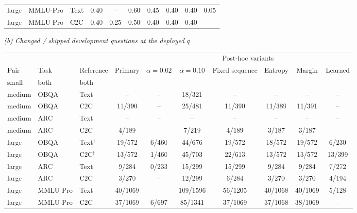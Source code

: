 \begin{table}[!htbp]
\begin{tabular*}{\linewidth}{@{}lll@{\extracolsep{\fill}}ccccccc@{}}
large & MMLU-Pro & Text & 0.40 & -- & 0.60 & 0.45 & 0.40 & 0.40 & 0.05\\
large & MMLU-Pro & C2C & 0.40 & 0.25 & 0.50 & 0.40 & 0.40 & 0.40 & --\\\bottomrule
\end{tabular*}
\par\vspace{17pt}
\textit{(b) Changed / skipped development questions at the deployed $q$}\par\smallskip
\begin{tabular*}{\linewidth}{@{}lll@{\extracolsep{\fill}}ccccccc@{}}\toprule
& & & & \multicolumn{6}{c}{Post-hoc variants}\\\cmidrule(l){5-10}
Pair & Task & Reference & Primary & $\alpha=0.02$ & $\alpha=0.10$ & Fixed sequence & Entropy & Margin & Learned\\\midrule
small & both & both & -- & -- & -- & -- & -- & -- & --\\
\addlinespace[3pt]
medium & OBQA & Text & -- & -- & 18/321 & -- & -- & -- & --\\
medium & OBQA & C2C & 11/390 & -- & 25/481 & 11/390 & 11/389 & 11/391 & --\\
medium & ARC & Text & -- & -- & -- & -- & -- & -- & --\\
medium & ARC & C2C & 4/189 & -- & 7/219 & 4/189 & 3/187 & 3/187 & --\\
\addlinespace[3pt]
large & OBQA & Text$^\ddagger$ & 19/572 & 6/460 & 44/676 & 19/572 & 18/572 & 19/572 & 6/230\\
large & OBQA & C2C$^\ddagger$ & 13/572 & 1/460 & 45/703 & 22/613 & 13/572 & 13/572 & 13/399\\
large & ARC & Text & 9/284 & 0/233 & 15/299 & 15/299 & 9/284 & 9/284 & 7/272\\
large & ARC & C2C & 3/270 & -- & 12/299 & 6/284 & 3/270 & 3/270 & 4/194\\
large & MMLU-Pro & Text & 40/1069 & -- & 109/1596 & 56/1205 & 40/1068 & 40/1069 & 5/128\\
large & MMLU-Pro & C2C & 37/1069 & 6/697 & 85/1341 & 37/1069 & 37/1068 & 38/1069 & --\\\bottomrule
\end{tabular*}
\end{table}

